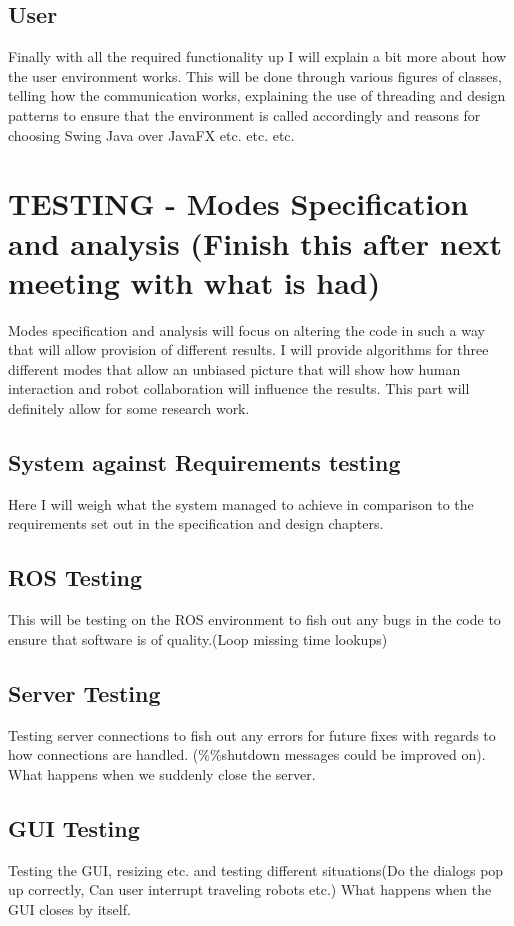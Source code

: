 \documentclass{report}
\begin{document}
    \section{User}
      Finally with all the required functionality up I will explain a bit more about how the user environment works. This will be done through various figures of classes, telling how the communication works, explaining the use of threading and design patterns to ensure that the environment is called accordingly and reasons for choosing Swing Java over JavaFX etc. etc. etc.

  \chapter{TESTING - Modes Specification and analysis (Finish this after next meeting with what is had)}
    Modes specification and analysis will focus on altering the code in such a way that will allow provision of different results. I will provide algorithms for three different modes that allow an unbiased picture that will show how human interaction and robot collaboration will influence the results. This part will definitely allow for some research work.

    \section{System against Requirements testing}
      Here I will weigh what the system managed to achieve in comparison to the requirements set out in the specification and design chapters.
    \section{ROS Testing}
      This will be testing on the ROS environment to fish out any bugs in the code to ensure that software is of quality.(Loop missing time lookups)
    \section{Server Testing}
      Testing server connections to fish out any errors for future fixes with regards to how connections are handled. (\%\%shutdown messages could be improved on). What happens when we suddenly close the server.
    \section{GUI Testing}
      Testing the GUI, resizing etc. and testing different situations(Do the dialogs pop up correctly, Can user interrupt traveling robots etc.) What happens when the GUI closes by itself.
\end{document}
